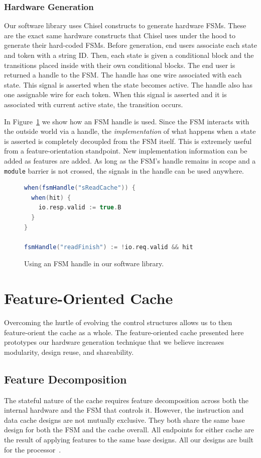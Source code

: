 \documentclass[conference]{IEEEtran}
\begin{document}
\subsubsection{Hardware Generation}
Our software library uses Chisel constructs to generate hardware FSMs. These are the exact same hardware constructs that Chisel uses under the hood to generate their hard-coded FSMs. Before generation, end users associate each state and token with a string ID. Then, each state is given a conditional block and the transitions placed inside with their own conditional blocks. The end user is returned a handle to the FSM. The handle has one wire associated with each state. This signal is asserted when the state becomes active. The handle also has one assignable wire for each token. When this signal is asserted and it is associated with current active state, the transition occurs.

In Figure~\ref{fig:handle} we show how an FSM handle is used. Since the FSM interacts with the outside world via a handle, the \emph{implementation} of what happens when a state is asserted is completely decoupled from the FSM itself. This is extremely useful from a feature-orientation standpoint. New implementation information can be added as features are added. As long as the FSM's handle remains in scope and a \texttt{module} barrier is not crossed, the signals in the handle can be used anywhere. 

\begin{figure}[ht]
    \centering
    \begin{lstlisting}[language = Scala]
when(fsmHandle("sReadCache")) {
  when(hit) {
    io.resp.valid := true.B
  }
}

fsmHandle("readFinish") := !io.req.valid && hit
    \end{lstlisting}
    \caption{Using an FSM handle in our software library.}
    \label{fig:handle}
\end{figure}

\section{Feature-Oriented Cache}\label{sec:foc}
Overcoming the hurtle of evolving the control structures allows us to then feature-orient the cache as a whole. The feature-oriented cache presented here prototypes our hardware generation technique that we believe increases modularity, design reuse, and shareability.

\subsection{Feature Decomposition}
The stateful nature of the cache requires feature decomposition across both the internal hardware and the FSM that controls it. However, the instruction and data cache designs are not mutually exclusive. They both share the same base design for both the FSM and the cache overall. All endpoints for either cache are the result of applying features to the same base designs. All our designs are built for the \Riscvmini{} processor~\cite{RvMini}.
\end{document}
